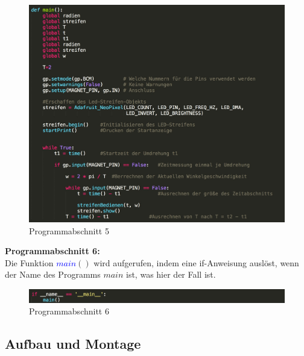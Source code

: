 \documentclass [a4paper, 11pt] {article}
\begin{document}
\begin{figure}[H]
	\centering
	\includegraphics[width=16cm]{P6.png}
	\caption{Programmabschnitt 5}
\end{figure} 
\textbf{\large Programmabschnitt 6:}\\
Die Funktion \textcolor{blue}{$main$}{$()$} wird aufgerufen, indem eine if-Anweisung auslöst, wenn der Name des Programms {$main$} ist, was hier der Fall ist.
\begin{figure}[H]
	\centering
	\includegraphics[width=16cm]{P7.png}
	\caption{Programmabschnitt 6}
\end{figure}
\subsection{Aufbau und Montage}
\end{document}
